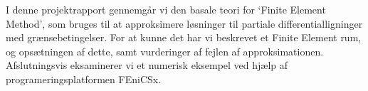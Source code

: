 I denne projektrapport gennemgår vi den basale teori 
for 
`Finite Element Method', som bruges til at approksimere løsninger til partiale differentialligninger med grænsebetingelser.
For at kunne det har vi beskrevet et Finite Element rum, og opsætningen af dette,
samt vurderinger af fejlen af approksimationen.
Afslutningsvis eksaminerer vi et numerisk eksempel ved hjælp af programeringsplatformen FEniCSx.